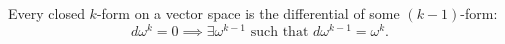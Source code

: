 Every closed $k$-form on a vector space is the differential of some $(k-1)$-form:
$$d\omega^k = 0 \implies \exists \omega^{k-1} \text{ such that } d\omega^{k-1} = \omega^k.$$
